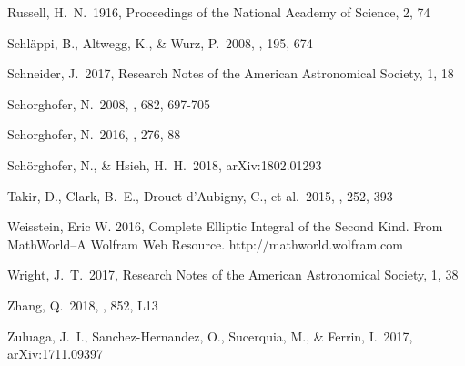 \documentclass[a4paper,fleqn,usenatbib]{mnras}
\begin{document}
\begin{thebibliography}{99}
 Russell, H.~N.\ 1916, Proceedings of the National Academy of Science, 2, 74 

 Schl{\"a}ppi, B., Altwegg, K., \& Wurz, P.\ 2008, \icarus, 195, 674 

 Schneider, J.\ 2017, Research Notes of the American Astronomical Society, 1, 18

 Schorghofer, N.\ 2008, \apj, 682, 697-705 

 Schorghofer, N.\ 2016, \icarus, 276, 88

 Sch{\"o}rghofer, N., \& Hsieh, H.~H.\ 2018, arXiv:1802.01293

 Takir, D., Clark, B.~E., Drouet d'Aubigny, C., et al.\ 2015, \icarus, 252, 393 

 Weisstein, Eric W. 2016, Complete Elliptic Integral of the Second Kind. From MathWorld--A Wolfram Web Resource. http://mathworld.wolfram.com

 Wright, J.~T.\ 2017, Research Notes of the American Astronomical Society, 1, 38 

 Zhang, Q.\ 2018, \apjl, 852, L13

 Zuluaga, J.~I., Sanchez-Hernandez, O., Sucerquia, M., \& Ferrin, I.\ 2017, arXiv:1711.09397

\end{thebibliography}


\bsp	%
\label{lastpage}
\end{document}
